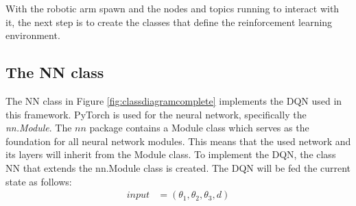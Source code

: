 \documentclass[12pt,oneside]{article}
\begin{document}
With the robotic arm spawn and the nodes and topics running to interact with it, the next step is to create the classes that define the reinforcement learning environment.

\subsection{The NN class}      
The NN class in Figure \ref{fig:classdiagramcomplete} implements the DQN used in this framework.         
PyTorch \cite{pytorch} is used for the neural network, specifically the \textit{nn.Module}. 
The $nn$ package contains a Module class which serves as the foundation for all neural network modules. This means that the used network and its layers will inherit from the Module class. To implement the DQN, the class NN that extends the nn.Module class is created. The DQN will be fed the current state as follows:
\begin{align}
	input &= (\theta_1, \theta_2, \theta_3, d) \label{eq:1}
\end{align}
\end{document}
